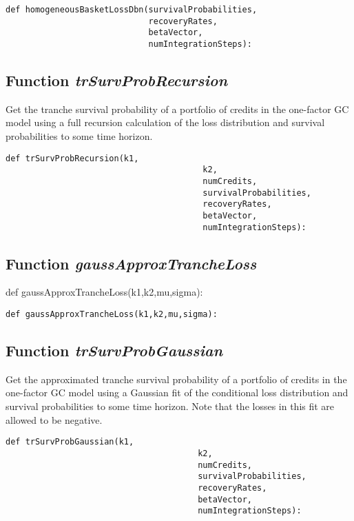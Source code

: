 \documentclass[twoside,11pt]{book}
\begin{document}
\begin{lstlisting}
def homogeneousBasketLossDbn(survivalProbabilities,
                             recoveryRates,
                             betaVector,
                             numIntegrationSteps):
\end{lstlisting}

\subsection{Function {\it trSurvProbRecursion}}
Get the tranche survival probability of a portfolio of credits in the one-factor GC model using a full recursion calculation of the loss distribution and survival probabilities to some time horizon. 

\begin{lstlisting}
def trSurvProbRecursion(k1,
                                        k2,
                                        numCredits,
                                        survivalProbabilities,
                                        recoveryRates,
                                        betaVector,
                                        numIntegrationSteps):
\end{lstlisting}

\subsection{Function {\it gaussApproxTrancheLoss}}
def gaussApproxTrancheLoss(k1,k2,mu,sigma):

\begin{lstlisting}
def gaussApproxTrancheLoss(k1,k2,mu,sigma):
\end{lstlisting}

\subsection{Function {\it trSurvProbGaussian}}
Get the approximated tranche survival probability of a portfolio of credits in the one-factor GC model using a Gaussian fit of the conditional loss distribution and survival probabilities to some time horizon. Note that the losses in this fit are allowed to be negative. 

\begin{lstlisting}
def trSurvProbGaussian(k1,
                                       k2,
                                       numCredits,
                                       survivalProbabilities,
                                       recoveryRates,
                                       betaVector,
                                       numIntegrationSteps):
\end{lstlisting}
\end{document}

